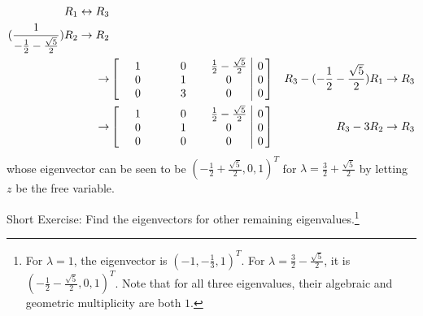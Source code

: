 \begin{solution}
\begin{align*}
\begin{aligned}
R_1 &\leftrightarrow R_3 \\
(\frac{1}{-\frac{1}{2}-\frac{\sqrt{5}}{2}})R_2 &\to R_2
\end{aligned} \\
\to&
\left[\begin{array}{@{\,}wc{30pt}wc{30pt}wc{30pt}|c@{\,}}
1 & 0 & \frac{1}{2}-\frac{\sqrt{5}}{2} & 0 \\
0 & 1 & 0 & 0 \\
0 & 3 & 0 & 0
\end{array}\right] & R_3 - (-\frac{1}{2}-\frac{\sqrt{5}}{2})R_1 \to R_3 \\
\to&
\left[\begin{array}{@{\,}wc{30pt}wc{30pt}wc{30pt}|c@{\,}}
1 & 0 & \frac{1}{2}-\frac{\sqrt{5}}{2} & 0 \\
0 & 1 & 0 & 0 \\
0 & 0 & 0 & 0
\end{array}\right] & R_3 - 3R_2 \to R_3
\end{align*}
whose eigenvector can be seen to be $(-\frac{1}{2}+\frac{\sqrt{5}}{2},0,1)^T$ for $\lambda = \frac{3}{2} + \frac{\sqrt{5}}{2}$ by letting $z$ be the free variable.
\end{solution}
Short Exercise: Find the eigenvectors for other remaining eigenvalues.\footnote{For $\lambda = 1$, the eigenvector is $(-1,-\frac{1}{3},1)^T$. For $\lambda = \frac{3}{2} - \frac{\sqrt{5}}{2}$, it is $(-\frac{1}{2}-\frac{\sqrt{5}}{2},0,1)^T$. Note that for all three eigenvalues, their algebraic and geometric multiplicity are both $1$.}

